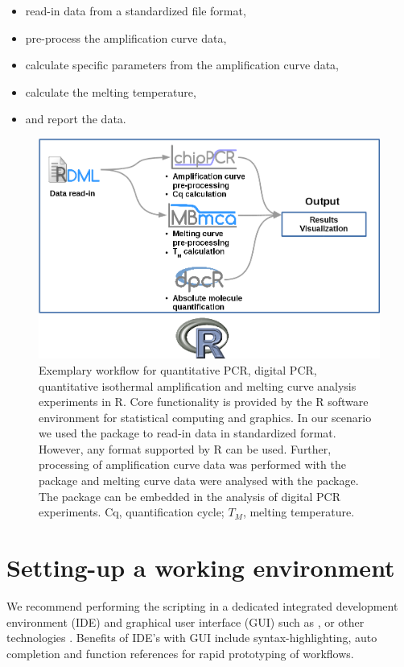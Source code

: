\begin{itemize}
 \item read-in data from a standardized file format,
 \item pre-process the amplification curve data,
 \item calculate specific parameters from the amplification curve data,
 \item calculate the melting temperature,
 \item and report the data.
\end{itemize}

\begin{figure}[htbp]
  \centering
  \includegraphics{figures/workflow.png}
  \caption{Exemplary workflow for quantitative PCR, digital PCR, quantitative 
isothermal amplification and melting curve analysis experiments in R. Core 
functionality is provided by the R software environment for statistical 
computing and graphics. In our scenario we used the  package to 
read-in data in standardized format. However, any format supported by R can be 
used. Further, processing of amplification curve data was performed with the 
 package and melting curve data were analysed with the 
 package. The  package can be embedded in the 
analysis of digital PCR experiments. Cq, quantification cycle; $T_{M}$, melting 
temperature. 
} 
\label{figure:workflow}
\end{figure}

\section{Setting-up a working environment}

We recommend performing the scripting in a dedicated integrated development 
environment (IDE) and graphical user interface (GUI) such as  
\citep{rodiger_rkward_2012}, 
 \citep{RStudio, gandrud_2013} or other technologies 
\citep{Valero_2012}. Benefits of IDE's with GUI include syntax-highlighting, 
auto completion and function references for rapid prototyping of workflows.

